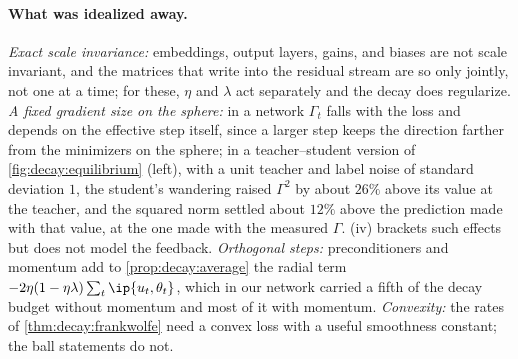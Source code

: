 \begin{refsection}
\paragraph{What was idealized away.} \emph{Exact scale invariance:} embeddings, output layers, gains, and biases are not scale invariant, and the matrices that write into the residual stream are so only jointly, not one at a time; for these, $\eta$ and $\lambda$ act separately and the decay does regularize. \emph{A fixed gradient size on the sphere:} in a network $\Gamma_t$ falls with the loss and depends on the effective step itself, since a larger step keeps the direction farther from the minimizers on the sphere; in a teacher--student version of \cref{fig:decay:equilibrium} (left), with a unit teacher and label noise of standard deviation $1$, the student's wandering raised $\Gamma^2$ by about $26\%$ above its value at the teacher, and the squared norm settled about $12\%$ above the prediction made with that value, at the one made with the measured $\Gamma$. (iv) brackets such effects but does not model the feedback. \emph{Orthogonal steps:} preconditioners and momentum add to \cref{prop:decay:average} the radial term $-2\eta(1-\eta\lambda)\sum_t\ip{u_t,\theta_t}$, which in our network carried a fifth of the decay budget without momentum and most of it with momentum. \emph{Convexity:} the rates of \cref{thm:decay:frankwolfe} need a convex loss with a useful smoothness constant; the ball statements do not.


\end{refsection}
